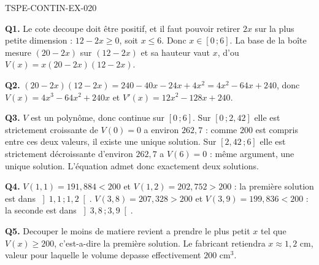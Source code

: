 \begin{corrige}{TSPE-CONTIN-EX-020}

\textbf{Q1.} Le cote decoupe doit être positif, et il faut pouvoir retirer $2x$ sur la plus petite dimension : $12 - 2x \geq 0$, soit $x \leq 6$. Donc $x \in [0\,;6]$. La base de la boîte mesure $(20-2x)$ sur $(12-2x)$ et sa hauteur vaut $x$, d'ou $V(x) = x(20-2x)(12-2x)$.

\textbf{Q2.} $(20-2x)(12-2x) = 240 - 40x - 24x + 4x^2 = 4x^2 - 64x + 240$, donc $V(x) = 4x^3 - 64x^2 + 240x$ et $V'(x) = 12x^2 - 128x + 240$.

\textbf{Q3.} $V$ est un polynôme, donc continue sur $[0\,;6]$. Sur $[0\,;2{,}42]$ elle est strictement croissante de $V(0) = 0$ a environ $262{,}7$ : comme $200$ est compris entre ces deux valeurs, il existe une unique solution. Sur $[2{,}42\,;6]$ elle est strictement décroissante d'environ $262{,}7$ a $V(6) = 0$ : même argument, une unique solution. L'équation admet donc exactement deux solutions.

\textbf{Q4.} $V(1{,}1) = 191{,}884 < 200$ et $V(1{,}2) = 202{,}752 > 200$ : la première solution est dans $\left]1{,}1\,;1{,}2\right[$. $V(3{,}8) = 207{,}328 > 200$ et $V(3{,}9) = 199{,}836 < 200$ : la seconde est dans $\left]3{,}8\,;3{,}9\right[$.

\textbf{Q5.} Decouper le moins de matiere revient a prendre le plus petit $x$ tel que $V(x) \geq 200$, c'est-a-dire la première solution. Le fabricant retiendra $x \approx 1{,}2$ cm, valeur pour laquelle le volume depasse effectivement $200$ cm$^3$.
\end{corrige}

